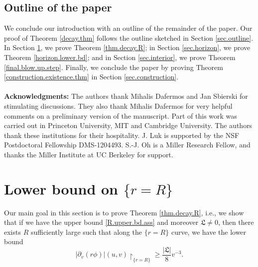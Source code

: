 \documentclass[12 pt, reqno]{amsart}
\theoremstyle{definition}
\theoremstyle{remark}
\numberwithin{equation}{section}
\newcommand{\rd}{\partial}
\newcommand{\0}{\emptyset}
\newcommand{\f}{\frac}
\begin{document}
\subsection{Outline of the paper} We conclude our introduction with an outline of the remainder of the paper. Our proof of Theorem \ref{decay.thm} follows the outline sketched in Section \ref{sec.outline}. In Section \ref{sec.lower.bd.R}, we prove Theorem \ref{thm.decay.R}; in Section \ref{sec.horizon}, we prove Theorem \ref{horizon.lower.bd}; and in Section \ref{sec.interior}, we prove Theorem \ref{final.blow.up.step}. Finally, we conclude the paper by proving Theorem \ref{construction.existence.thm} in Section \ref{sec.construction}.
\\
\\
\noindent
{\bf Acknowledgments:} The authors thank Mihalis Dafermos and Jan Sbierski for stimulating discussions. They also thank Mihalis Dafermos for very helpful comments on a preliminary version of the manuscript. Part of this work was carried out in Princeton University, MIT and Cambridge University. The authors thank these institutions for their hospitality. J. Luk is supported by the NSF Postdoctoral Fellowship DMS-1204493. S.-J. Oh is a Miller Research Fellow, and thanks the Miller Institute at UC Berkeley for support.

\section{Lower bound on $\{r=R\}$}\label{sec.lower.bd.R}
Our main goal in this section is to prove Theorem \ref{thm.decay.R}, i.e., we show that if we have the upper bound \eqref{R.upper.bd.ass} and moreover $\mathfrak{L}\neq 0$, then there exists $R$ sufficiently large such that along the $\{r=R\}$ curve, we have the lower bound 
\begin{equation} \label{eq:lb:r=R}
|\rd_v(r\phi)|(u,v) \restriction_{\{r=R\}}\geq \f{|\mathfrak L|} 8 v^{-3}.
\end{equation}
\end{document}
